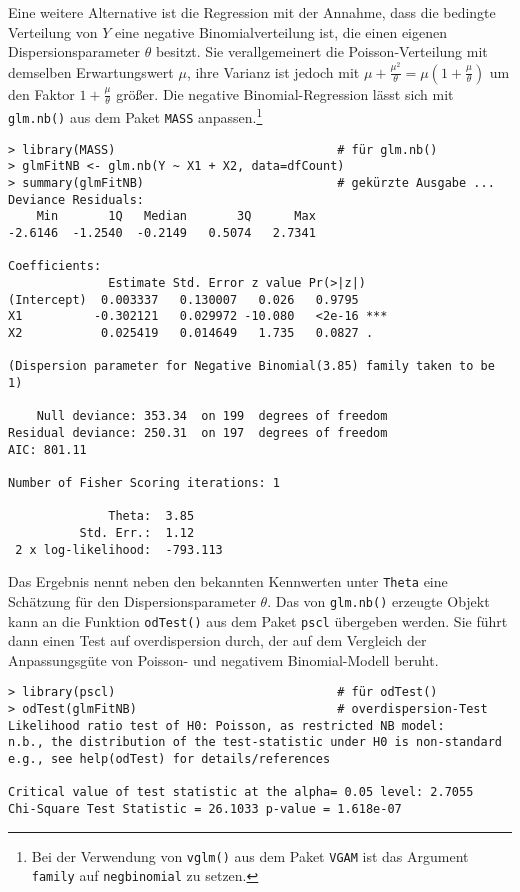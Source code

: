 Eine weitere Alternative ist die Regression mit der Annahme, dass die bedingte Verteilung von $Y$ eine negative Binomialverteilung ist, die einen eigenen Dispersionsparameter $\theta$ besitzt. Sie verallgemeinert die Poisson-Verteilung mit demselben Erwartungswert $\mu$, ihre Varianz ist jedoch mit $\mu + \frac{\mu^{2}}{\theta} = \mu (1 + \frac{\mu}{\theta})$ um den Faktor $1 + \frac{\mu}{\theta}$ größer. Die negative Binomial-Regression lässt sich mit \lstinline!glm.nb()! aus dem Paket \lstinline!MASS! anpassen.\footnote{Bei der Verwendung von \lstinline!vglm()! aus dem Paket \lstinline!VGAM! ist das Argument \lstinline!family! auf \lstinline!negbinomial! zu setzen.}
\begin{lstlisting}
> library(MASS)                               # für glm.nb()
> glmFitNB <- glm.nb(Y ~ X1 + X2, data=dfCount)
> summary(glmFitNB)                           # gekürzte Ausgabe ...
Deviance Residuals:
    Min       1Q   Median       3Q      Max
-2.6146  -1.2540  -0.2149   0.5074   2.7341

Coefficients:
              Estimate Std. Error z value Pr(>|z|)
(Intercept)  0.003337   0.130007   0.026   0.9795
X1          -0.302121   0.029972 -10.080   <2e-16 ***
X2           0.025419   0.014649   1.735   0.0827 .

(Dispersion parameter for Negative Binomial(3.85) family taken to be 1)

    Null deviance: 353.34  on 199  degrees of freedom
Residual deviance: 250.31  on 197  degrees of freedom
AIC: 801.11

Number of Fisher Scoring iterations: 1

              Theta:  3.85
          Std. Err.:  1.12
 2 x log-likelihood:  -793.113
\end{lstlisting}

Das Ergebnis nennt neben den bekannten Kennwerten unter \lstinline!Theta! eine Schätzung für den Dispersionsparameter $\theta$. Das von \lstinline!glm.nb()! erzeugte Objekt kann an die Funktion \lstinline!odTest()! aus dem Paket \lstinline!pscl! \cite{Zeileis2008} übergeben werden. Sie führt dann einen Test auf overdispersion durch, der auf dem Vergleich der Anpassungsgüte von Poisson- und negativem Binomial-Modell beruht.
\begin{lstlisting}
> library(pscl)                               # für odTest()
> odTest(glmFitNB)                            # overdispersion-Test
Likelihood ratio test of H0: Poisson, as restricted NB model:
n.b., the distribution of the test-statistic under H0 is non-standard
e.g., see help(odTest) for details/references

Critical value of test statistic at the alpha= 0.05 level: 2.7055
Chi-Square Test Statistic = 26.1033 p-value = 1.618e-07
\end{lstlisting}

